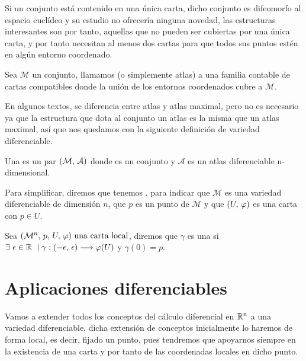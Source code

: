 Si un conjunto está contenido en una única carta, dicho conjunto es difeomorfo al espacio euclídeo y su estudio no
ofrecería ninguna novedad, las estructuras interesantes son por tanto, aquellas que no pueden ser cubiertas por una
única carta, y por tanto necesitan al menos dos cartas para que todos sus puntos estén en algún entorno coordenado.

\begin{definition}
Sea $\mathcal{M}$ un conjunto, llamamos  (o simplemente atlas) a una
familia contable de cartas compatibles donde la unión de los entornos coordenados cubre a $\mathcal{M}$.
\end{definition}

En algunos textos, se diferencia entre atlas y atlas maximal, pero no es necesario ya que la estructura que dota al
conjunto un atlas es la misma que un atlas maximal, así que nos quedamos con la siguiente definición de variedad
diferenciable.

\begin{definition}
  Una  es un par $(\mathcal{M},\thinspace\mathcal{A})$
  donde  es un conjunto y $\mathcal{A}$ es un atlas diferenciable n-dimensional.
\end{definition}
Para simplificar, diremos que tenemos ,
para indicar que $\mathcal{M}$ es una variedad diferenciable de dimensión $n$, que $p$ es un punto de
$\mathcal{M}$ y que $(U,\thinspace\varphi)$ es una carta con $p\in
U$.

\begin{definition}
  Sea $(\mathcal{M}^n,\thinspace p,\thinspace U,\thinspace \varphi)\textmd{ una carta local}$, diremos que $\gamma$ es una \label{curva-centrada} si $\exists\ \epsilon\in\mathbb{R} \ \mid \gamma:(-\epsilon,\thinspace\epsilon)
  \longrightarrow \varphi(U)$ y
  $\gamma(0)=p$.
\end{definition}

\section{Aplicaciones diferenciables}
Vamos a extender todos los conceptos del cálculo diferencial en $\mathbb{R}^n$ a una variedad diferenciable, dicha extensión
de conceptos inicialmente lo haremos de forma local, es decir, fijado un punto, pues tendremos que apoyarnos siempre
en la existencia de una carta y por tanto de las coordenadas locales en dicho punto.

